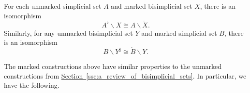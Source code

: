 \documentclass[main.tex]{subfiles}
\begin{document}
\begin{example}
  For each unmarked simplicial set $A$ and marked bisimplicial set $X$, there is an isomorphism
  \begin{equation*}
    A^{\flat} \backslash X \cong A \backslash \mathring{X}.
  \end{equation*}
  Similarly, for any unmarked bisimplicial set $Y$ and marked simplicial set $B$, there is an isomorphism
  \begin{equation*}
    B \backslash Y^{\sharp} \cong \mathring{B} \backslash Y.
  \end{equation*}
\end{example}

The marked constructions above have similar properties to the unmarked constructions from \hyperref[ssc:a_review_of_bisimplicial_sets]{Section~\ref*{ssc:a_review_of_bisimplicial_sets}}. In particular, we have the following.
\end{document}
